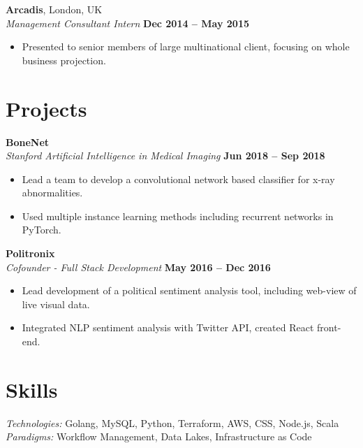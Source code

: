 \documentclass[margin,line]{resume}
\begin{document}
\begin{resume}
    \textbf{Arcadis}, London, UK \vspace{1mm}\\\vspace{1mm}%
    \textsl{Management Consultant Intern} \hfill \textbf{Dec 2014 -- May 2015}
    \begin{itemize}
        \item Presented to senior members of large multinational client, focusing on whole business projection.
    \end{itemize}

   \section{\mysidestyle Projects}

    \textbf{BoneNet} \vspace{1mm}\\\vspace{1mm}%
    \textsl{Stanford Artificial Intelligence in Medical Imaging} \hfill \textbf{Jun 2018 -- Sep 2018}
    \begin{itemize}
        \item Lead a team to develop a convolutional network based classifier for x-ray abnormalities.
        \item Used multiple instance learning methods including recurrent networks in PyTorch.
    \end{itemize}

    \textbf{Politronix} \vspace{1mm}\\\vspace{1mm}%
    \textsl{Cofounder - Full Stack Development} \hfill \textbf{May 2016 -- Dec 2016}
    \begin{itemize}
        \item Lead development of a political sentiment analysis tool, including web-view of live visual data.
        \item Integrated NLP sentiment analysis with Twitter API, created React front-end.
    \end{itemize}

    \section{\mysidestyle Skills}

    \emph{Technologies:} Golang, MySQL, Python, Terraform, AWS, CSS, Node.js, Scala \\
    \emph{Paradigms:} Workflow Management, Data Lakes, Infrastructure as Code

\end{resume}
\end{document}
